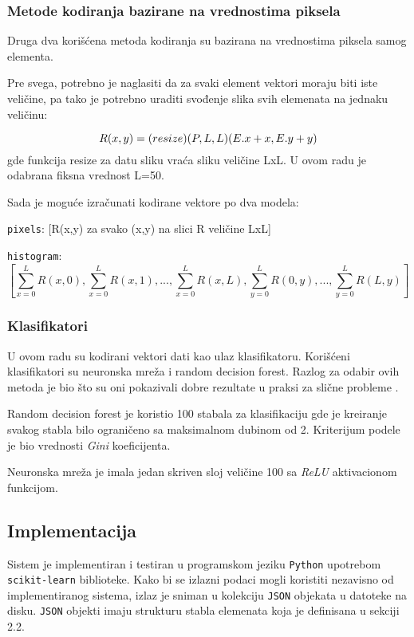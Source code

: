 \documentclass[]{amsart}
\begin{document}
\subsubsection{Metode kodiranja bazirane na vrednostima piksela}
\label{sec:org582acb2}

Druga dva korišćena metoda kodiranja su bazirana na vrednostima piksela samog elementa.

Pre svega, potrebno je naglasiti da za svaki element vektori moraju biti iste veličine, pa tako je potrebno uraditi svođenje slika svih elemenata
na jednaku veličinu:

$$ R(x,y) = \text(resize)(P, L, L)(E.x + x, E.y + y) $$ gde funkcija resize za datu sliku vraća sliku veličine LxL. U ovom radu je odabrana fiksna vrednost L=50.

Sada je moguće izračunati kodirane vektore po dva modela:

\texttt{pixels}: [R(x,y) za svako (x,y) na slici R veličine LxL]

\texttt{histogram}: $$ [\sum_{x=0}^L R(x, 0), \sum_{x=0}^L R(x, 1), ..., \sum_{x=0}^L R(x, L), \sum_{y=0}^L R(0, y), ...,  \sum_{y=0}^L R(L, y)] $$

\subsubsection{Klasifikatori}
\label{sec:org0ef63da}

U ovom radu su kodirani vektori dati kao ulaz klasifikatoru. Korišćeni klasifikatori su neuronska mreža i random decision forest. Razlog za
odabir ovih metoda je bio što su oni pokazivali dobre rezultate u praksi za slične probleme \cite{bitew2018logical} \cite{he2017extracting}.

Random decision forest je koristio 100 stabala za klasifikaciju gde je kreiranje svakog stabla bilo ograničeno sa maksimalnom dubinom od 2. Kriterijum podele je bio vrednosti \textit{Gini} koeficijenta. 

Neuronska mreža je imala jedan skriven sloj veličine 100 sa \textit{ReLU} aktivacionom funkcijom. 

\subsection{Implementacija}
\label{sec:orgf94d64a}

Sistem je implementiran i testiran u programskom jeziku \texttt{Python} upotrebom \texttt{scikit-learn} biblioteke. Kako bi se izlazni podaci mogli koristiti nezavisno od
implementiranog sistema, izlaz je sniman u kolekciju \texttt{JSON} objekata u datoteke na disku. \texttt{JSON} objekti imaju strukturu stabla elemenata koja je definisana u
sekciji 2.2.
\end{document}
